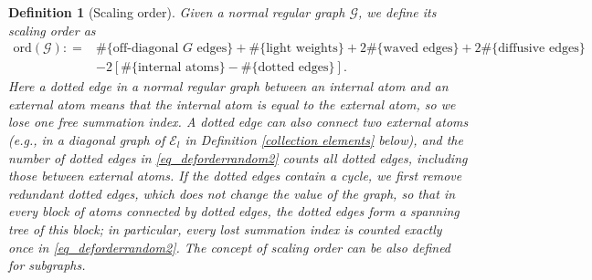 \documentclass{article}
\newcommand{\1}{\mathds{1}}
\numberwithin{equation}{section}
\renewcommand{\cal}{\mathcal}
\newcommand{\dashed}{\text{diffusive}}
\DeclareMathOperator{\OO}{O}
\theoremstyle{plain} %
\newtheorem{definition}[theorem]{Definition}
\theoremstyle{remark}
\newtheorem{remark}[theorem]{Remark}
\newcommand{\Sele}{{\mathcal E}}
\begin{document}
   \begin{definition} [Scaling order] \label{def scaling}
	Given a normal regular  graph $\cal G$, we define its scaling order as 
	\begin{align}
		\text{ord}(\cal G): = & \#\{\text{off-diagonal }  G  \text{ edges}\} + \#\{\text{light weights}\} + 2\#\{ \text{waved edges}\}  + 2 \#\{\text{$\dashed$ edges}\} \nonumber\\
		&  - 2\left[ \#\{\text{internal atoms}\}- \#\{\text{dotted edges}\} \right]. \label{eq_deforderrandom2}
	\end{align}
	Here a dotted edge in a normal regular graph between an internal atom and an external atom means that the internal atom is equal to the external atom, so we lose one free summation index. A dotted edge can also connect two external atoms (e.g., in a diagonal graph of $\Sele_l$ in Definition \ref{collection elements} below), and the number of dotted edges in \eqref{eq_deforderrandom2} counts all dotted edges, including those between external atoms. If the dotted edges contain a cycle, we first remove redundant dotted edges, which does not change the value of the graph, so that in every block of atoms connected by dotted edges, the dotted edges form a spanning tree of this block; in particular, every lost summation index is counted exactly once in \eqref{eq_deforderrandom2}. The concept of scaling order can be also defined for subgraphs.
\end{definition}  
\end{document}
